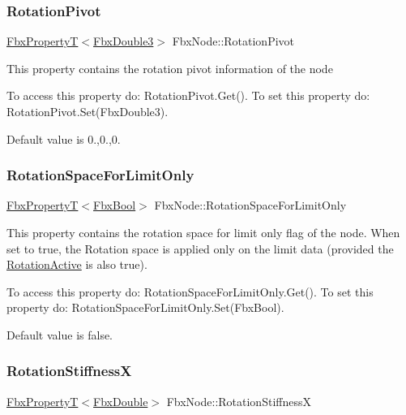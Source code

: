 \subsubsection{\texorpdfstring{Rotation\+Pivot}{RotationPivot}}
{\footnotesize\ttfamily \hyperlink{class_fbx_property_t}{Fbx\+PropertyT}$<$\hyperlink{fbxtypes_8h_ae0a96f14cde566774c7553aa7523b7a7}{Fbx\+Double3}$>$ Fbx\+Node\+::\+Rotation\+Pivot}

This property contains the rotation pivot information of the node

To access this property do\+: Rotation\+Pivot.\+Get(). To set this property do\+: Rotation\+Pivot.\+Set(\+Fbx\+Double3).

Default value is 0.,0.,0. \mbox{\label{class_fbx_node_a7fe7f807388b6d974c612bbf432604e4}} 
\subsubsection{\texorpdfstring{Rotation\+Space\+For\+Limit\+Only}{RotationSpaceForLimitOnly}}
{\footnotesize\ttfamily \hyperlink{class_fbx_property_t}{Fbx\+PropertyT}$<$\hyperlink{fbxtypes_8h_a92e0562b2fe33e76a242f498b362262e}{Fbx\+Bool}$>$ Fbx\+Node\+::\+Rotation\+Space\+For\+Limit\+Only}

This property contains the rotation space for limit only flag of the node. When set to {\ttfamily true}, the Rotation space is applied only on the limit data (provided the \hyperlink{class_fbx_node_aaa4a7a57dc28f7979c04c096bd94b752}{Rotation\+Active} is also {\ttfamily true}).

To access this property do\+: Rotation\+Space\+For\+Limit\+Only.\+Get(). To set this property do\+: Rotation\+Space\+For\+Limit\+Only.\+Set(\+Fbx\+Bool).

Default value is false. \mbox{\label{class_fbx_node_afb4e18a55373bff597d3827026e049d1}} 
\subsubsection{\texorpdfstring{Rotation\+StiffnessX}{RotationStiffnessX}}
{\footnotesize\ttfamily \hyperlink{class_fbx_property_t}{Fbx\+PropertyT}$<$\hyperlink{fbxtypes_8h_a171e72a1c46fc15c1a6c9c31948c1c5b}{Fbx\+Double}$>$ Fbx\+Node\+::\+Rotation\+StiffnessX}

